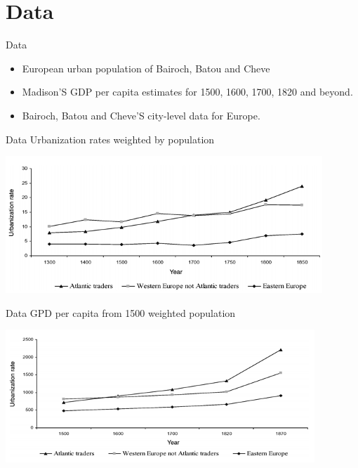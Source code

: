 \documentclass[pdftex,12pt,xcolor=pdftex,table]{beamer}
\theoremstyle{definition}
\theoremstyle{remark}
\numberwithin{equation}{section}
\numberwithin{figure}{section}
\begin{document}
	\section{Data}
		\begin{frame}{Data}
			\justifying
			\begin{itemize}
			    \item European urban population of Bairoch, Batou and Cheve
			    \vspace{5mm} 
			    \item Madison'S GDP per capita estimates for 1500, 1600, 1700, 1820 and beyond.
			    \vspace{5mm} 
			    \item Bairoch, Batou and Cheve'S city-level data for Europe.
			\end{itemize}
		\end{frame}
		\begin{frame}{Data}
			\justifying
			\centering
			Urbanization rates weighted by population
			
			\includegraphics[scale=0.7]{pp10.png}
		\end{frame}
		\begin{frame}{Data}
			\justifying
			\centering
			GPD per capita from 1500 weighted population 
			
			\includegraphics[scale=0.7]{pp11.png}
		\end{frame}
	
\end{document}
